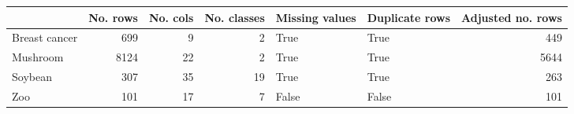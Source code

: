 \begin{tabular}{lrrrllr}
\toprule
{} &  No. rows &  No. cols &  No. classes &  Missing values &  Duplicate rows &  Adjusted no. rows \\
\midrule
Breast cancer &       699 &         9 &            2 &            True &            True &                449 \\
Mushroom      &      8124 &        22 &            2 &            True &            True &               5644 \\
Soybean       &       307 &        35 &           19 &            True &            True &                263 \\
Zoo           &       101 &        17 &            7 &           False &           False &                101 \\
\bottomrule
\end{tabular}
